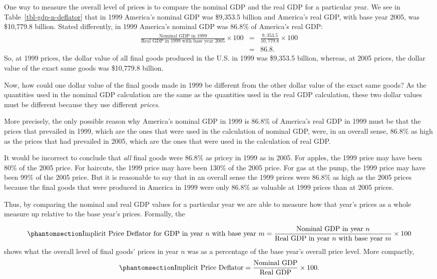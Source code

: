 \documentclass[
  letterpaper,
]{book}
\theoremstyle{plain}
\theoremstyle{remark}
\begin{document}
One way to measure the overall level of prices is to compare the nominal
GDP and the real GDP for a particular year. We see in
Table~\ref{tbl-gdp-n-deflator} that in 1999 America's nominal GDP was
\$9,353.5 billion and America's real GDP, with base year 2005, was
\$10,779.8 billion. Stated differently, in 1999 America's nominal GDP
was 86.8\% of America's real GDP: \[
\begin{eqnarray*} 
\frac{\text{Nominal GDP in 1999}}{\text{Real GDP in 1999 with base year 2005}}\times 100&=&\frac{9,353.5}{10,779.8}\times 100\\
&=& 86.8.
\end{eqnarray*} 
\] So, at 1999 prices, the dollar value of all final goods produced in
the U.S. in 1999 was \$9,353.5 billion, whereas, at 2005 prices, the
dollar value of the exact same goods was \$10,779.8 billion.

Now, how could one dollar value of the final goods made in 1999 be
different from the other dollar value of the exact same goods? As the
quantities used in the nominal GDP calculation are the same as the
quantities used in the real GDP calculation, these two dollar values
must be different because they use different \emph{prices}.

More precisely, the only possible reason why America's nominal GDP in
1999 is 86.8\% of America's real GDP in 1999 must be that the prices
that prevailed in 1999, which are the ones that were used in the
calculation of nominal GDP, were, in an overall sense, 86.8\% as high as
the prices that had prevailed in 2005, which are the ones that were used
in the calculation of real GDP.

It would be incorrect to conclude that \emph{all} final goods were
86.8\% as pricey in 1999 as in 2005. For apples, the 1999 price may have
been 80\% of the 2005 price. For haircuts, the 1999 price may have been
130\% of the 2005 price. For gas at the pump, the 1999 price may have
been 99\% of the 2005 price. But it is reasonable to say that in an
overall sense the 1999 prices were 86.8\% as high as the 2005 prices
because the final goods that were produced in America in 1999 were only
86.8\% as valuable at 1999 prices than at 2005 prices.

Thus, by comparing the nominal and real GDP values for a particular year
we are able to measure how that year's prices as a whole measure up
relative to the base year's prices. Formally, the

\begin{equation}\phantomsection\label{eq-IPDGDP}{
\text{Implicit Price Deflator for GDP in year $n$ with base year $m$} = \frac{\text{Nominal GDP in year $n$}}{\text{Real GDP in year $n$ with base year $m$}}\times 100
}\end{equation} shows what the overall level of final goods' prices in
year \(n\) was as a percentage of the base year's overall price level.
More compactly,
\begin{equation}\phantomsection\label{eq-IPDGDP_compact}{ 
\text{Implicit Price Deflator}=
\frac{\text{Nominal GDP}}{\text{Real GDP}}\times 100.
}\end{equation}
\end{document}
